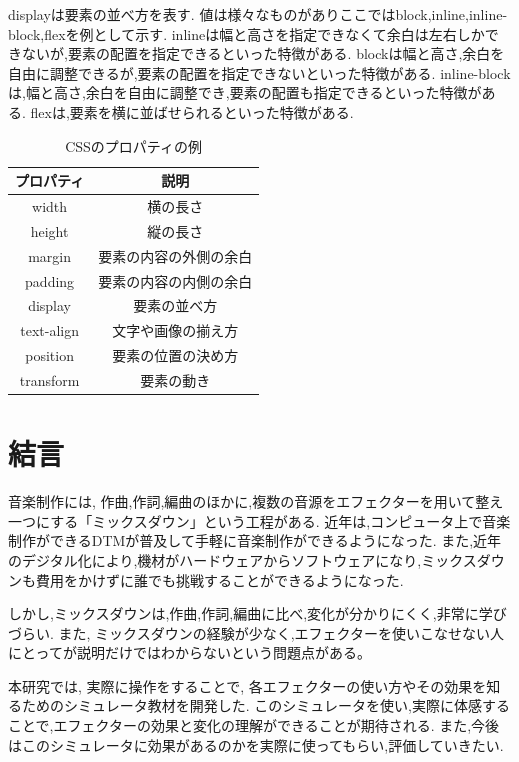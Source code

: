 \documentclass[12pt,a4j,titlepage]{ltjsarticle}
\begin{document}
displayは要素の並べ方を表す.
値は様々なものがありここではblock,inline,inline-block,flexを例として示す.
inlineは幅と高さを指定できなくて余白は左右しかできないが,要素の配置を指定できるといった特徴がある.
blockは幅と高さ,余白を自由に調整できるが,要素の配置を指定できないといった特徴がある.
inline-blockは,幅と高さ,余白を自由に調整でき,要素の配置も指定できるといった特徴がある.
flexは,要素を横に並ばせられるといった特徴がある.

\begin{table}[h]
  \centering
  \caption{CSSのプロパティの例}
  \label{table:css}
  \small
  \begin{tabular}{cc}
    \hline
    プロパティ  & 説明    \\
    \hline \hline
    width  & 横の長さ\\
    \hline
    height  & 縦の長さ\\
    \hline
    margin  & 要素の内容の外側の余白 \\
    \hline
    padding  &  要素の内容の内側の余白\\
    \hline
    display  &  要素の並べ方\\
    \hline
    text-align  &  文字や画像の揃え方\\
    \hline
    position  &  要素の位置の決め方\\
    \hline
    transform  &  要素の動き\\
    \hline
  \end{tabular}
\end{table}

\newpage
\section{結言}
音楽制作には, 作曲,作詞,編曲のほかに,複数の音源をエフェクターを用いて整え一つにする「ミックスダウン」という工程がある\cite{mix}.
近年は,コンピュータ上で音楽制作ができるDTMが普及して手軽に音楽制作ができるようになった.
また,近年のデジタル化により,機材がハードウェアからソフトウェアになり,ミックスダウンも費用をかけずに誰でも挑戦することができるようになった\cite{digital}.

しかし,ミックスダウンは,作曲,作詞,編曲に比べ,変化が分かりにくく,非常に学びづらい.
また, ミックスダウンの経験が少なく,エフェクターを使いこなせない人にとってが説明だけではわからないという問題点がある。

本研究では, 実際に操作をすることで, 各エフェクターの使い方やその効果を知るためのシミュレータ教材を開発した.
このシミュレータを使い,実際に体感することで,エフェクターの効果と変化の理解ができることが期待される.
また,今後はこのシミュレータに効果があるのかを実際に使ってもらい,評価していきたい.
\end{document}
